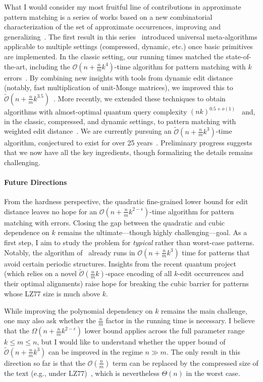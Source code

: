 \documentclass[a4paper,11pt]{article}
\newcommand{\Oh}{\mathcal{O}}
\newcommand{\Ohtilde}{\tilde{\mathcal{O}}}
\begin{document}
What I would consider my most fruitful line of contributions in approximate pattern matching is a series of works based on a new combinatorial characterization of the set of approximate occurrences, improving and generalizing~\cite{DBLP:conf/soda/BringmannWK19}.
The first result in this series~\cite{FOCS2020_Charalampopoulos} introduced universal meta-algorithms applicable to multiple settings (compressed, dynamic, etc.) once basic primitives are implemented. 
In the classic setting, our running times matched the state-of-the-art, including the $\Oh(n+\frac{n}{m}k^4)$-time algorithm for pattern matching with $k$ errors~\cite{DBLP:conf/soda/ColeH98}. 
By combining new insights with tools from dynamic edit distance (notably, fast multiplication of unit-Monge matrices), we improved this to $\Ohtilde(n+\frac{n}{m}k^{3.5})$~\cite{FOCS2022a}.
More recently, we extended these techniques to obtain algorithms with almost-optimal quantum query complexity $(nk)^{0.5+o(1)}$~\cite{KNW24,KNW25}
and, in the classic, compressed, and dynamic settings, to pattern matching with weighted edit distance~\cite{CKW25}.
We are currently pursuing an $\Ohtilde(n+\frac{n}{m}k^3)$-time algorithm, conjectured to exist for over 25 years~\cite{DBLP:conf/soda/ColeH98}.
Preliminary progress suggests that we now have all the key ingredients, though formalizing the details remains challenging.

\paragraph*{Future Directions}
From the hardness perspective, the quadratic fine-grained lower bound for edit distance leaves no hope for an $\Oh(n + \frac{n}{m}k^{2-\epsilon})$-time algorithm for pattern matching with errors.
Closing the gap between the quadratic and cubic dependence on $k$ remains the ultimate---though highly challenging---goal. 
As a first step, I aim to study the problem for \emph{typical} rather than worst-case patterns.
Notably, the algorithm of~\cite{DBLP:conf/soda/ColeH98} already runs in $\Oh(n+\frac{n}{m}k^3)$ time for patterns that avoid certain periodic structures.
Insights from the recent quantum project~\cite{KNW24} (which relies on a novel $\Ohtilde(\frac{n}{m}k)$-space encoding of all $k$-edit occurrences and their optimal alignments) raise hope for breaking the cubic barrier for patterns whose LZ77 size is much above $k$.

While improving the polynomial dependency on $k$ remains the main challenge, one may also ask whether the $\frac{n}{m}$ factor in the running time is necessary.
I believe that the $\Omega(n+\frac{n}{m}k^{2-\epsilon})$ lower bound applies across the full parameter range $k \le m \le n$, but I would like to understand whether the upper bound of $\Ohtilde(n+\frac{n}{m}k^3)$ can be improved in the regime $n \gg m$.
The only result in this direction so far is that the $\Oh(\frac{n}{m})$ term can be replaced by the compressed size of the text (e.g., under LZ77)~\cite{FOCS2020_Charalampopoulos}, which is nevertheless $\Theta(n)$ in the worst case.
\end{document}
